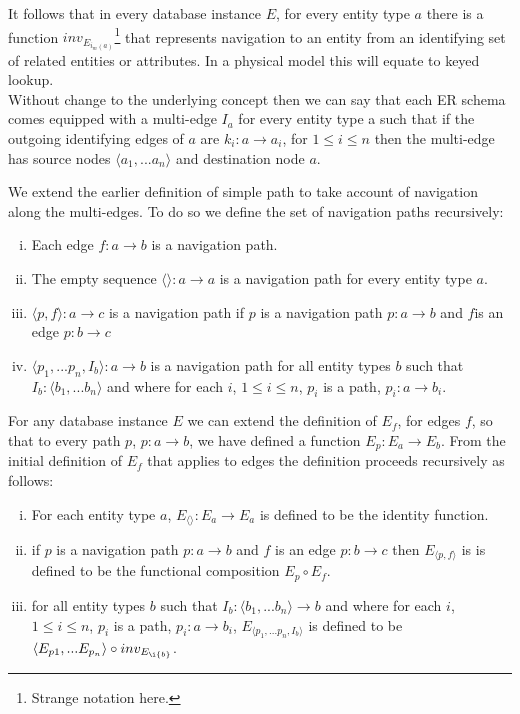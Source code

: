 \documentclass[10pt,a4paper]{article}
\newcommand{\genericmodel}{\mathcal{M}}
\renewcommand{\genericmodel}{{m}}
\newcommand{\iedges}[2] [\genericmodel]{i_{#1}(#2)}
\begin{document}
\noindent It follows that in every database instance $E$, for every entity type $a$ there is a function 
$inv_{E_{\iedges{a}}}$\footnote{Strange notation here.}  that represents navigation to an entity from an identifying set of related entities or attributes. 
In a physical model this will equate to keyed lookup. \\

\noindent Without change to the underlying concept then we can say that each ER schema comes equipped with a multi-edge $I_a$ for every entity type a such that if 
the outgoing identifying edges of $a$ are $k_i: a \rightarrow a_i$, for $1 \leq i \leq n$  then the multi-edge has source nodes $\langle a_1,...a_n\rangle$ and destination node $a$.  

\noindent We extend the earlier  definition of simple path to take account of navigation along the multi-edges. To do so we define the set of navigation paths recursively:

\begin{enumerate} [(i)]
\item{ Each edge $f: a \rightarrow b$ is a navigation path.
}
\item{ The empty sequence  $\langle \rangle : a \rightarrow a$ is a navigation path for every entity type $a$.
}
\item{ $\langle p,f \rangle : a \rightarrow c$ is a navigation path  if $p$ is a navigation path $p: a \rightarrow b$ and $f $is an edge $p: b \rightarrow c$
}
\item{ $\langle p_1,...p_n,I_b\rangle : a \rightarrow b$ is a navigation path for all entity types $b$ such that $I_b: \langle b_1,...b_n\rangle$ and where
for each $i$, $1 \leq i \leq n$, $p_i$ is a path, $p_i: a \rightarrow b_i$.   
}
\end{enumerate}

\noindent For any database instance $E$ we can  extend  the definition of
$E_f$, for edges $f$,  so that to every path $p$, $p: a \rightarrow b$,  we have defined a function $E_p: E_a \rightarrow E_b$. From the initial definition of $E_f$ that applies to 
edges the definition proceeds recursively as follows: 
\begin{enumerate} [(i)]
\item{  For each entity type $a$, $E_{\langle \rangle}: E_a \rightarrow E_a$ is defined to be the identity function.
}

\item{   if $p$ is a navigation path $p: a \rightarrow b$ and $f$ is an edge $p: b \rightarrow c$ then $E_{\langle p,f \rangle}$ is 
is defined to be the functional composition $E_p \circ E_f$.
}

\item{ for all entity types $b$ such that $I_b: \langle b_1,...b_n\rangle \rightarrow b$ and where
for each $i$, $1 \leq i \leq n$, $p_i$ is a path, $p_i: a \rightarrow b_i$, $E_{\langle p_1,...p_n,I_b\rangle}$ is defined to be 
$\langle E_{p1},...E_{p_n} \rangle \circ inv_{E_{\i{b}}}$.
}
\end{enumerate}
\end{document}
